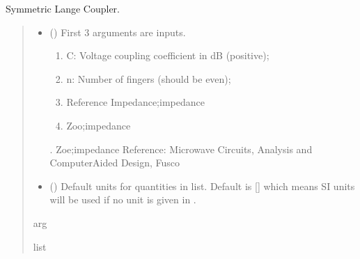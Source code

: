 \documentclass[letterpaper,10pt,english]{sphinxmanual}
\begin{document}

\begin{fulllineitems}
\label{\detokenize{components:components.SymmetricLangeCoupler}}
\pysigstartsignatures
{}
\pysigstopsignatures
\sphinxAtStartPar
Symmetric Lange Coupler.
\begin{quote}\begin{description}
\begin{itemize}
\item {}
\sphinxAtStartPar
{} () \textendash{}
\sphinxAtStartPar
First 3 arguments are inputs.
\begin{enumerate}
%
\item {}
\sphinxAtStartPar
C: Voltage coupling coefficient in dB (positive);

\item {}
\sphinxAtStartPar
n: Number of fingers (should be even);

\item {}
\sphinxAtStartPar
Reference Impedance;impedance

\item {}
\sphinxAtStartPar
Zoo;impedance

\end{enumerate}

. Zoe;impedance
Reference:  Microwave Circuits, Analysis and Computer\sphinxhyphen{}Aided Design, Fusco


\item {}
\sphinxAtStartPar
{} (\sphinxstyleliteralemphasis{\sphinxupquote{, }}) \textendash{} Default units for quantities in  list. Default is {[}{]} which means SI units will be used if no unit is given in .

\end{itemize}

\sphinxAtStartPar
arg

\sphinxAtStartPar
list

\end{description}\end{quote}

\end{fulllineitems}
\end{document}
